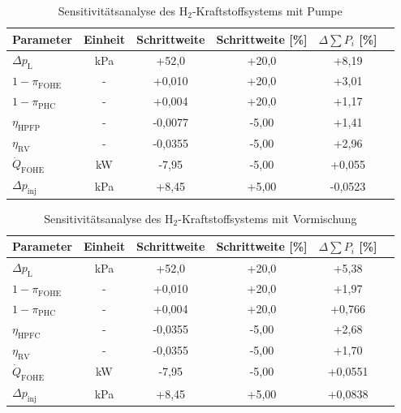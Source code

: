 \begin{table}[ht]
	\centering
	\caption{Sensitivitätsanalyse des H$_2$-Kraftstoffsystems mit Pumpe}
	\begin{tabular} {|l|c|c|c|c|c|} \hline%
		Parameter & Einheit & Schrittweite & Schrittweite [\%] & $ \Delta \sum P_i$ [\%] \\ \hline\hline%
		$\Delta p_\mathrm{L}$ & \si{\kilo\Pa} & +52,0 & +20,0 & +8,19 \\ \hline 
		$1-\pi_\mathrm{FOHE}$ & - & +0,010 & +20,0 & +3,01 \\ \hline 
		$1-\pi_\mathrm{PHC}$ & - & +0,004 & +20,0 & +1,17 \\ \hline
		$\eta_\mathrm{HPFP}$ & - & -0,0077 & -5,00 & +1,41 \\ \hline  
		$\eta_\mathrm{RV}$ & - & -0,0355 & -5,00 & +2,96 \\ \hline 
		$\dot{Q}_\mathrm{FOHE}$ & \si{\kilo\W} & -7,95 & -5,00 & +0,055 \\ \hline 
		$\Delta p_\mathrm{inj}$ & \si{\kilo\Pa} & +8,45 & +5,00 & -0,0523 \\ \hline 
	\end{tabular}	
	\label{Tab:senspump}%
\end{table}
\FloatBarrier 

\begin{table}[ht]
	\centering
	\caption{Sensitivitätsanalyse des H$_2$-Kraftstoffsystems mit Vormischung}
	\begin{tabular} {|l|c|c|c|c|c|} \hline%
		Parameter & Einheit & Schrittweite & Schrittweite [\%] & $ \Delta \sum P_i$ [\%] \\ \hline\hline%
		$\Delta p_\mathrm{L}$ & \si{\kilo\Pa} & +52,0 & +20,0 & +5,38 \\ \hline 
		$1-\pi_\mathrm{FOHE}$ & - & +0,010 & +20,0 & +1,97 \\ \hline 
		$1-\pi_\mathrm{PHC}$ & - & +0,004 & +20,0 & +0,766 \\ \hline
		$\eta_\mathrm{HPFC}$ & - & -0,0355 & -5,00 & +2,68 \\ \hline  
		$\eta_\mathrm{RV}$ & - & -0,0355 & -5,00 & +1,70 \\ \hline 
		$\dot{Q}_\mathrm{FOHE}$ & \si{\kilo\W} & -7,95 & -5,00 & +0,0551 \\ \hline 
		$\Delta p_\mathrm{inj}$ & \si{\kilo\Pa} & +8,45 & +5,00 & +0,0838 \\ \hline 
	\end{tabular}	
	\label{Tab:sensdual}%
\end{table}
\FloatBarrier 

